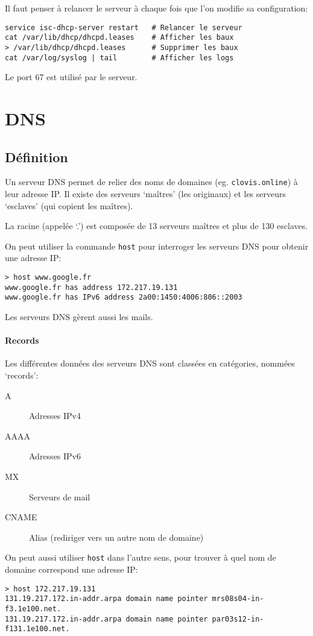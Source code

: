 \documentclass[10pt,a4paper,french]{article}
\begin{document}
Il faut penser à relancer le serveur à chaque fois que l'on modifie sa configuration:
\begin{verbatim}
service isc-dhcp-server restart   # Relancer le serveur
cat /var/lib/dhcp/dhcpd.leases    # Afficher les baux
> /var/lib/dhcp/dhcpd.leases      # Supprimer les baux
cat /var/log/syslog | tail        # Afficher les logs
\end{verbatim}

Le port 67 est utilisé par le serveur.

\section{DNS}

\subsection{Définition}

Un serveur DNS permet de relier des noms de domaines (eg. {\tt clovis.online}) à leur adresse IP. Il existe des serveurs `maîtres' (les originaux) et les serveurs `esclaves' (qui copient les maîtres).

La racine (appelée `.') est composée de 13 serveurs maîtres et plus de 130 esclaves.

On peut utiliser la commande {\tt host} pour interroger les serveurs DNS pour obtenir une adresse IP:
\begin{verbatim}
> host www.google.fr
www.google.fr has address 172.217.19.131
www.google.fr has IPv6 address 2a00:1450:4006:806::2003
\end{verbatim}

Les serveurs DNS gèrent aussi les mails.

\paragraph{Records}
Les différentes données des serveurs DNS sont classées en catégories, nommées `records':
\begin{description}
\item[A] Adresses IPv4
\item[AAAA] Adresses IPv6
\item[MX] Serveurs de mail
\item[CNAME] Alias (rediriger vers un autre nom de domaine)
\end{description}

On peut aussi utiliser {\tt host} dans l'autre sens, pour trouver à quel nom de domaine correspond une adresse IP:
\begin{verbatim}
> host 172.217.19.131
131.19.217.172.in-addr.arpa domain name pointer mrs08s04-in-f3.1e100.net.
131.19.217.172.in-addr.arpa domain name pointer par03s12-in-f131.1e100.net.
\end{verbatim}
\end{document}

